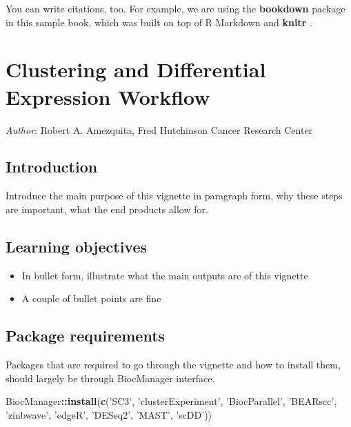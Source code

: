 \documentclass[]{book}
\newenvironment{Shaded}{\begin{snugshade}}{\end{snugshade}}
\newcommand{\KeywordTok}[1]{\textcolor[rgb]{0.13,0.29,0.53}{\textbf{#1}}}
\newcommand{\NormalTok}[1]{#1}
\newcommand{\OperatorTok}[1]{\textcolor[rgb]{0.81,0.36,0.00}{\textbf{#1}}}
\newcommand{\StringTok}[1]{\textcolor[rgb]{0.31,0.60,0.02}{#1}}
\providecommand{\tightlist}{%
  \setlength{\itemsep}{0pt}\setlength{\parskip}{0pt}}
\begin{document}
You can write citations, too. For example, we are using the \textbf{bookdown} package \citep{R-bookdown} in this sample book, which was built on top of R Markdown and \textbf{knitr} \citep{xie2015}.

\hypertarget{clustering-and-differential-expression-workflow}{%
\chapter{Clustering and Differential Expression Workflow}\label{clustering-and-differential-expression-workflow}}

\emph{Author}: Robert A. Amezquita, Fred Hutchinson Cancer Research Center

\hypertarget{introduction}{%
\section{Introduction}\label{introduction}}

Introduce the main purpose of this vignette in paragraph form, why these steps are important, what the end products allow for.

\hypertarget{learning-objectives}{%
\section{Learning objectives}\label{learning-objectives}}

\begin{itemize}
\tightlist
\item
  In bullet form, illustrate what the main outputs are of this vignette
\item
  A couple of bullet points are fine
\end{itemize}

\hypertarget{package-requirements}{%
\section{Package requirements}\label{package-requirements}}

Packages that are required to go through the vignette and how to install them, should largely be through BiocManager interface.

\begin{Shaded}
\begin{Highlighting}[]
\NormalTok{BiocManager}\OperatorTok{::}\KeywordTok{install}\NormalTok{(}\KeywordTok{c}\NormalTok{(}\StringTok{'SC3'}\NormalTok{, }\StringTok{'clusterExperiment'}\NormalTok{, }\StringTok{'BiocParallel'}\NormalTok{, }\StringTok{'BEARscc'}\NormalTok{, }\StringTok{'zinbwave'}\NormalTok{, }\StringTok{'edgeR'}\NormalTok{, }\StringTok{'DESeq2'}\NormalTok{, }\StringTok{'MAST'}\NormalTok{, }\StringTok{'scDD'}\NormalTok{))}
\end{Highlighting}
\end{Shaded}
\end{document}
